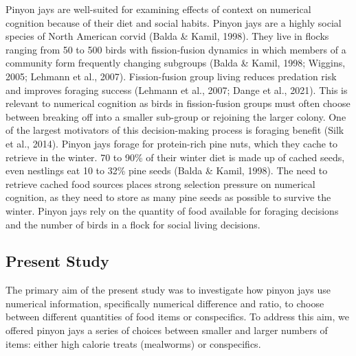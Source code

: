 \documentclass[
  ,doc,floatsintext]{apa6}
\begin{document}
Pinyon jays are well-suited for examining effects of context on numerical cognition because of their diet and social habits. Pinyon jays are a highly social species of North American corvid (Balda \& Kamil, 1998). They live in flocks ranging from 50 to 500 birds with fission-fusion dynamics in which members of a community form frequently changing subgroups (Balda \& Kamil, 1998; Wiggins, 2005; Lehmann et al., 2007). Fission-fusion group living reduces predation risk and improves foraging success (Lehmann et al., 2007; Dange et al., 2021). This is relevant to numerical cognition as birds in fission-fusion groups must often choose between breaking off into a smaller sub-group or rejoining the larger colony. One of the largest motivators of this decision-making process is foraging benefit (Silk et al., 2014). Pinyon jays forage for protein-rich pine nuts, which they cache to retrieve in the winter. 70 to 90\% of their winter diet is made up of cached seeds, even nestlings eat 10 to 32\% pine seeds (Balda \& Kamil, 1998). The need to retrieve cached food sources places strong selection pressure on numerical cognition, as they need to store as many pine seeds as possible to survive the winter. Pinyon jays rely on the quantity of food available for foraging decisions and the number of birds in a flock for social living decisions.

\hypertarget{present-study}{%
\subsection{Present Study}\label{present-study}}

The primary aim of the present study was to investigate how pinyon jays use numerical information, specifically numerical difference and ratio, to choose between different quantities of food items or conspecifics. To address this aim, we offered pinyon jays a series of choices between smaller and larger numbers of items: either high calorie treats (mealworms) or conspecifics.
\end{document}
